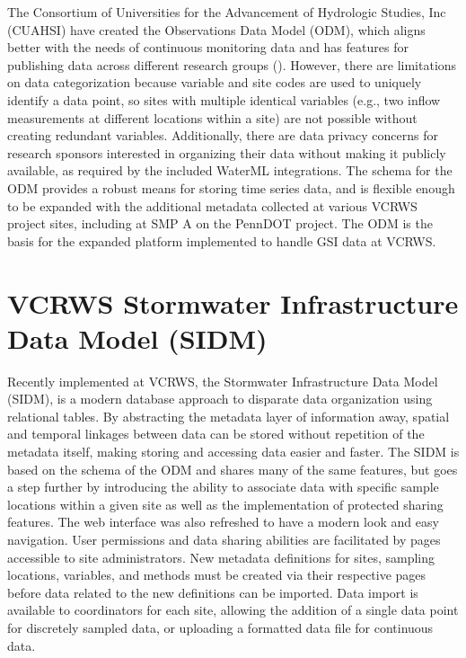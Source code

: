 The Consortium of Universities for the Advancement of Hydrologic Studies, Inc (CUAHSI) have created the Observations Data Model (ODM), which aligns better with the needs of continuous monitoring data and has features for publishing data across different research groups (\cite{Horsburgh2008a,Maidment2008}).
However, there are limitations on data categorization because variable and site codes are used to uniquely identify a data point, so sites with multiple identical variables (e.g., two inflow measurements at different locations within a site) are not possible without creating redundant variables.
Additionally, there are data privacy concerns for research sponsors interested in organizing their data without making it publicly available, as required by the included WaterML integrations.
The schema for the ODM provides a robust means for storing time series data, and is flexible enough to be expanded with the additional metadata collected at various VCRWS project sites, including at SMP A on the PennDOT project.
The ODM is the basis for the expanded platform implemented to handle GSI data at VCRWS.

\section{VCRWS Stormwater Infrastructure Data Model (SIDM)}

Recently implemented at VCRWS, the Stormwater Infrastructure Data Model (SIDM), is a modern database approach to disparate data organization using relational tables.
By abstracting the metadata layer of information away, spatial and temporal linkages between data can be stored without repetition of the metadata itself, making storing and accessing data easier and faster.
The SIDM is based on the schema of the ODM and shares many of the same features, but goes a step further by introducing the ability to associate data with specific sample locations within a given site as well as the implementation of protected sharing features.
The web interface was also refreshed to have a modern look and easy navigation.
User permissions and data sharing abilities are facilitated by pages accessible to site administrators.
New metadata definitions for sites, sampling locations, variables, and methods must be created via their respective pages before data related to the new definitions can be imported.
Data import is available to coordinators for each site, allowing the addition of a single data point for discretely sampled data, or uploading a formatted data file for continuous data.

